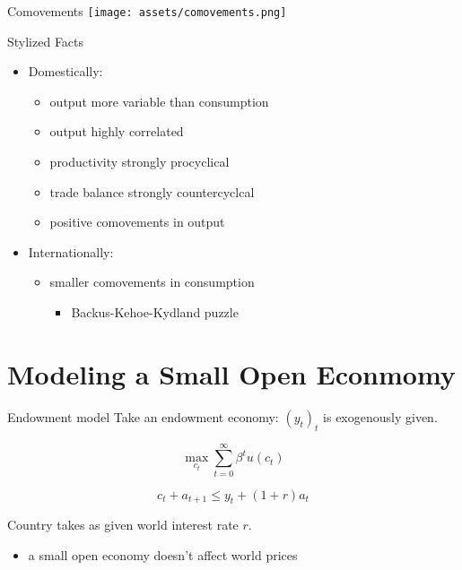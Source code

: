 \documentclass[
  ignorenonframetext,
]{beamer}
\providecommand{\tightlist}{%
  \setlength{\itemsep}{0pt}\setlength{\parskip}{0pt}}\usepackage{longtable,booktabs,array}
\begin{document}
\begin{frame}{Comovements}
\label{comovements}
\texttt{[image: assets/comovements.png]}
\end{frame}

\begin{frame}{Stylized Facts}
\label{stylized-facts}
\begin{itemize}[<+->]
\tightlist
\item
  Domestically:

  \begin{itemize}[<+->]
  \tightlist
  \item
    output more variable than consumption
  \item
    output highly correlated
  \item
    productivity strongly procyclical
  \item
    trade balance strongly countercyclcal
  \item
    positive comovements in output
  \end{itemize}
\item
  Internationally:

  \begin{itemize}[<+->]
  \tightlist
  \item
    smaller comovements in consumption

    \begin{itemize}[<+->]
    \tightlist
    \item
      Backus-Kehoe-Kydland puzzle
    \end{itemize}
  \end{itemize}
\end{itemize}
\end{frame}

\section{Modeling a Small Open
Econmomy}\label{modeling-a-small-open-econmomy}

\begin{frame}{Endowment model}
\label{endowment-model}
Take an endowment economy: \((y_t)_t\) is exogenously given.

\[\max_{c_t} \sum_{t=0}^{\infty} \beta^t u(c_t)\]

\[c_t+a_{t+1} \leq y_t + (1+r) a_t\]

Country takes as given world interest rate \(r\).

\begin{itemize}
\tightlist
\item
  a small open economy doesn't affect world prices
\end{itemize}
\end{frame}
\end{document}
